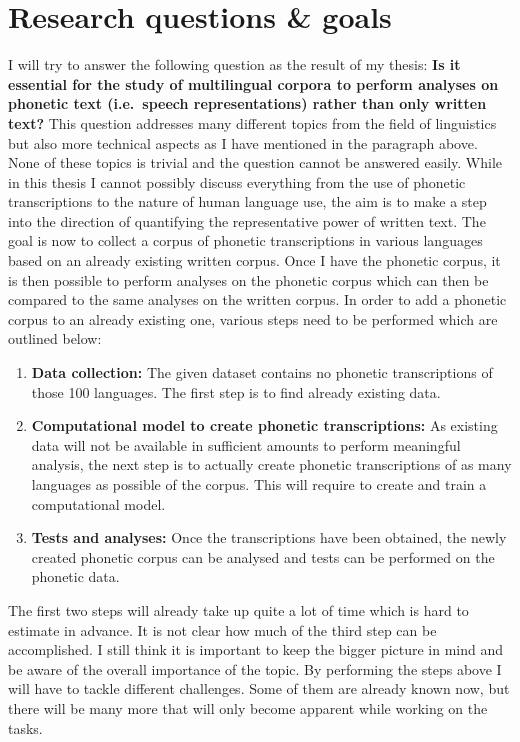 \section{Research questions \& goals}
I will try to answer the following question as the result of my thesis: \textbf{Is it essential for the study of multilingual corpora to perform analyses on phonetic text (i.e.\ speech representations) rather than only written text?} This question addresses many different topics from the field of linguistics but also more technical aspects as I have mentioned in the paragraph above. None of these topics is trivial and the question cannot be answered easily. While in this thesis I cannot possibly discuss everything from the use of phonetic transcriptions to the nature of human language use, the aim is to make a step into the direction of quantifying the representative power of written text. The goal is now to collect a corpus of phonetic transcriptions in various languages based on an already existing written corpus. Once I have the phonetic corpus, it is then possible to perform analyses on the phonetic corpus which can then be compared to the same analyses on the written corpus. In order to add a phonetic corpus to an already existing one, various steps need to be performed which are outlined below:
\begin{enumerate}
 \item \textbf{Data collection:} The given dataset contains no phonetic transcriptions of those 100 languages. The first step is to find already existing data. 
 \item \textbf{Computational model to create phonetic transcriptions:} As existing data will not be available in sufficient amounts to perform meaningful analysis, the next step is to actually create phonetic transcriptions of as many languages as possible of the corpus. This will require to create and train a computational model.
 \item \textbf{Tests and analyses:} Once the transcriptions have been obtained, the newly created phonetic corpus can be analysed and tests can be performed on the phonetic data.
\end{enumerate}

The first two steps will already take up quite a lot of time which is hard to estimate in advance. It is not clear how much of the third step can be accomplished. I still think it is important to keep the bigger picture in mind and be aware of the overall importance of the topic. By performing the steps above I will have to tackle different challenges. Some of them are already known now, but there will be many more that will only become apparent while working on the tasks. 

